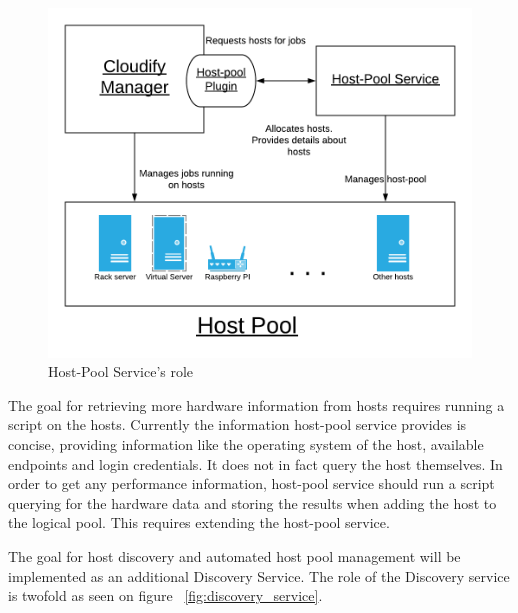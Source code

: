  \begin{figure}[ht!]
\centering
  \includegraphics[width=\textwidth, keepaspectratio]{Cloudify_roles.png}%
  \caption{Host-Pool Service's role}
  \label{fig:cloudify_roles}
\end{figure}

The goal for retrieving more hardware information from hosts requires running a script on the hosts. Currently the information host-pool service provides is concise, providing information like the operating system of the host, available endpoints and login credentials. It does not in fact query the host themselves. In order to get any performance information, host-pool service should run a script querying for the hardware data and storing the results when adding the host to the logical pool. This requires extending  the host-pool service.

The goal for host discovery and automated host pool management will be implemented as an additional Discovery Service.
The role of the Discovery service is twofold as seen on figure ~\ref{fig:discovery_service}.


